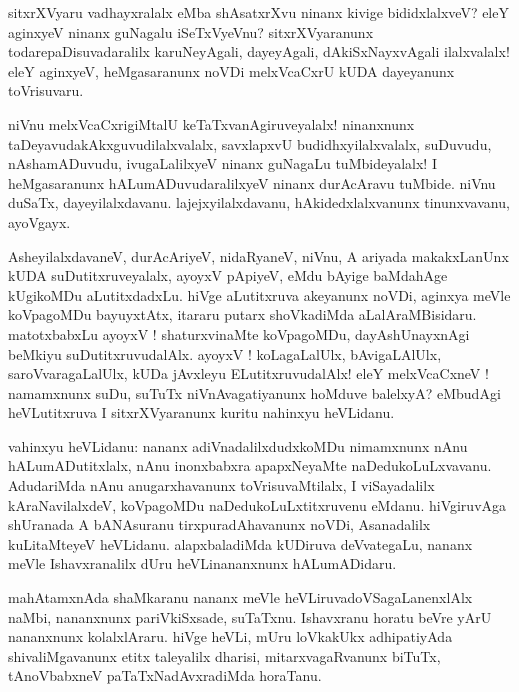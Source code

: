 \documentclass{article}
\begin{document}
\begin{mn}
sitxrXVyaru vadhayxralalx eMba shAsatxrXvu ninanx kivige bididxlalxveV? eleY aginxyeV ninanx 
guNagalu iSeTxVyeVnu? sitxrXVyaranunx todarepaDisuvadaralilx karuNeyAgali, dayeyAgali, 
dAkiSxNayxvAgali ilalxvalalx! eleY aginxyeV, heMgasaranunx noVDi melxVcaCxrU kUDA dayeyanunx 
toVrisuvaru.
\end{mn}

\begin{mn}
niVnu melxVcaCxrigiMtalU keTaTxvanAgiruveyalalx! ninanxnunx taDeyavudakAkxguvudilalxvalalx,
savxlapxvU budidhxyilalxvalalx, suDuvudu, nAshamADuvudu, ivugaLalilxyeV ninanx guNagaLu 
tuMbideyalalx! I heMgasaranunx hALumADuvudaralilxyeV ninanx durAcAravu tuMbide. niVnu duSaTx,
dayeyilalxdavanu. lajejxyilalxdavanu, hAkidedxlalxvanunx tinunxvavanu, ayoVgayx.
\end{mn}

\begin{mn}
AsheyilalxdavaneV, durAcAriyeV, nidaRyaneV, niVnu, A ariyada makakxLanUnx kUDA suDutitxruveyalalx,
ayoyxV pApiyeV, eMdu bAyige baMdahAge kUgikoMDu aLutitxdadxLu. hiVge aLutitxruva akeyanunx 
noVDi, aginxya meVle koVpagoMDu bayuyxtAtx, itararu putarx shoVkadiMda aLalAraMBisidaru.
matotxbabxLu ayoyxV ! shaturxvinaMte koVpagoMDu, dayAshUnayxnAgi beMkiyu suDutitxruvudalAlx.
ayoyxV ! koLagaLalUlx, bAvigaLAlUlx, saroVvaragaLalUlx, kUDa jAvxleyu ELutitxruvudalAlx!
eleY melxVcaCxneV ! namamxnunx suDu, suTuTx niVnAvagatiyanunx hoMduve balelxyA? eMbudAgi 
heVLutitxruva I sitxrXVyaranunx kuritu nahinxyu heVLidanu.
\end{mn}

\begin{mn}
vahinxyu heVLidanu: nananx adiVnadalilxdudxkoMDu nimamxnunx nAnu hALumADutitxlalx, nAnu inonxbabxra 
apapxNeyaMte naDedukoLuLxvavanu. AdudariMda nAnu anugarxhavanunx toVrisuvaMtilalx, I viSayadalilx 
kAraNavilalxdeV, koVpagoMDu naDedukoLuLxtitxruvenu eMdanu. hiVgiruvAga shUranada A bANAsuranu
tirxpuradAhavanunx noVDi, Asanadalilx kuLitaMteyeV heVLidanu. alapxbaladiMda kUDiruva 
deVvategaLu, nananx meVle Ishavxranalilx dUru heVLinananxnunx hALumADidaru.
\end{mn}

\begin{mn}
mahAtamxnAda shaMkaranu nananx meVle heVLiruvadoVSagaLanenxlAlx naMbi, nananxnunx pariVkiSxsade, 
suTaTxnu. Ishavxranu horatu beVre yArU nananxnunx kolalxlAraru. hiVge heVLi, mUru loVkakUkx 
adhipatiyAda shivaliMgavanunx etitx taleyalilx dharisi, mitarxvagaRvanunx biTuTx, tAnoVbabxneV 
paTaTxNadAvxradiMda horaTanu.
\end{mn}
\end{document}
